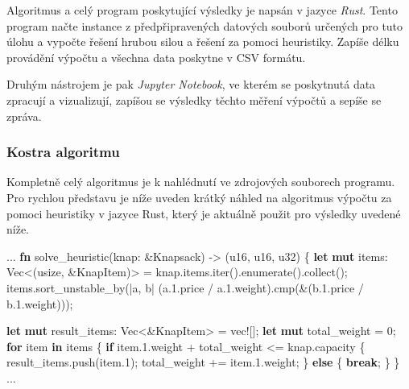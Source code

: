 \documentclass[11pt]{article}
\newenvironment{Shaded}{}{}
\newcommand{\KeywordTok}[1]{\textcolor[rgb]{0.00,0.44,0.13}{\textbf{{#1}}}}
\newcommand{\DataTypeTok}[1]{\textcolor[rgb]{0.56,0.13,0.00}{{#1}}}
\newcommand{\DecValTok}[1]{\textcolor[rgb]{0.25,0.63,0.44}{{#1}}}
\newcommand{\NormalTok}[1]{{#1}}
\newcommand{\OperatorTok}[1]{\textcolor[rgb]{0.40,0.40,0.40}{{#1}}}
\newcommand{\PreprocessorTok}[1]{\textcolor[rgb]{0.74,0.48,0.00}{{#1}}}
\begin{document}
Algoritmus a celý program poskytující výsledky je napsán v jazyce
\emph{Rust}. Tento program načte instance z předpřipravených datových
souborů určených pro tuto úlohu a vypočte řešení hrubou silou a řešení
za pomoci heuristiky. Zapíše délku provádění výpočtu a všechna data
poskytne v CSV formátu.

Druhým nástrojem je pak \emph{Jupyter Notebook}, ve kterém se poskytnutá
data zpracují a vizualizují, zapíšou se výsledky těchto měření výpočtů a
sepíše se zpráva.

\newpage

\subsubsection{Kostra algoritmu}\label{kostra-algoritmu}

Kompletně celý algoritmus je k nahlédnutí ve zdrojových souborech
programu. Pro rychlou představu je níže uveden krátký náhled na
algoritmus výpočtu za pomoci heuristiky v jazyce Rust, který je aktuálně
použit pro výsledky uvedené níže.

\begin{Shaded}
\begin{Highlighting}[]
\NormalTok{...}
\KeywordTok{fn}\NormalTok{ solve_heuristic(knap: &Knapsack) -> (}\DataTypeTok{u16}\NormalTok{, }\DataTypeTok{u16}\NormalTok{, }\DataTypeTok{u32}\NormalTok{) }\OperatorTok{\{}
    \KeywordTok{let} \KeywordTok{mut}\NormalTok{ items: }\DataTypeTok{Vec}\NormalTok{<(}\DataTypeTok{usize}\NormalTok{, &KnapItem)> = knap.items.iter().enumerate().collect();}
\NormalTok{    items.sort_unstable_by(|a, b| (a.}\DecValTok{1.}\NormalTok{price / a.}\DecValTok{1.}\NormalTok{weight).cmp(&(b.}\DecValTok{1.}\NormalTok{price / b.}\DecValTok{1.}\NormalTok{weight)));}
    
    \KeywordTok{let} \KeywordTok{mut}\NormalTok{ result_items: }\DataTypeTok{Vec}\NormalTok{<&KnapItem> = }\PreprocessorTok{vec!}\OperatorTok{[]}\NormalTok{;}
    \KeywordTok{let} \KeywordTok{mut}\NormalTok{ total_weight = }\DecValTok{0}\NormalTok{;}
    \KeywordTok{for}\NormalTok{ item }\KeywordTok{in}\NormalTok{ items }\OperatorTok{\{}
        \KeywordTok{if}\NormalTok{ item.}\DecValTok{1.}\NormalTok{weight + total_weight <= knap.capacity }\OperatorTok{\{}
\NormalTok{            result_items.push(item.}\DecValTok{1}\NormalTok{);}
\NormalTok{            total_weight += item.}\DecValTok{1.}\NormalTok{weight;}
        \OperatorTok{\}} \KeywordTok{else} \OperatorTok{\{}
            \KeywordTok{break}\NormalTok{;}
        \OperatorTok{\}}
    \OperatorTok{\}}
\NormalTok{...}
\end{Highlighting}
\end{Shaded}
\end{document}
